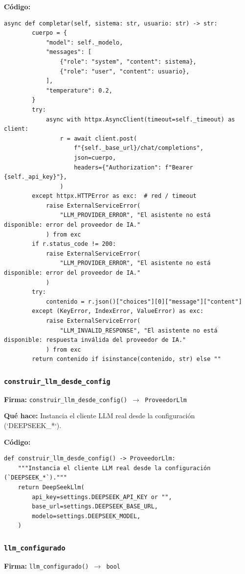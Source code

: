 \documentclass[11pt,a4paper]{article}
\begin{document}
\textbf{Código:}
\begin{lstlisting}
async def completar(self, sistema: str, usuario: str) -> str:
        cuerpo = {
            "model": self._modelo,
            "messages": [
                {"role": "system", "content": sistema},
                {"role": "user", "content": usuario},
            ],
            "temperature": 0.2,
        }
        try:
            async with httpx.AsyncClient(timeout=self._timeout) as client:
                r = await client.post(
                    f"{self._base_url}/chat/completions",
                    json=cuerpo,
                    headers={"Authorization": f"Bearer {self._api_key}"},
                )
        except httpx.HTTPError as exc:  # red / timeout
            raise ExternalServiceError(
                "LLM_PROVIDER_ERROR", "El asistente no está disponible: error del proveedor de IA."
            ) from exc
        if r.status_code != 200:
            raise ExternalServiceError(
                "LLM_PROVIDER_ERROR", "El asistente no está disponible: error del proveedor de IA."
            )
        try:
            contenido = r.json()["choices"][0]["message"]["content"]
        except (KeyError, IndexError, ValueError) as exc:
            raise ExternalServiceError(
                "LLM_INVALID_RESPONSE", "El asistente no está disponible: respuesta inválida del proveedor de IA."
            ) from exc
        return contenido if isinstance(contenido, str) else ""
\end{lstlisting}

\subsubsection*{\texttt{construir\_llm\_desde\_config}}
\textbf{Firma:} \texttt{construir\_llm\_desde\_config() $\rightarrow$ ProveedorLlm}

\textbf{Qué hace:} Instancia el cliente LLM real desde la configuración (`DEEPSEEK\_*`).

\textbf{Código:}
\begin{lstlisting}
def construir_llm_desde_config() -> ProveedorLlm:
    """Instancia el cliente LLM real desde la configuración (`DEEPSEEK_*`)."""
    return DeepSeekLlm(
        api_key=settings.DEEPSEEK_API_KEY or "",
        base_url=settings.DEEPSEEK_BASE_URL,
        modelo=settings.DEEPSEEK_MODEL,
    )
\end{lstlisting}

\subsubsection*{\texttt{llm\_configurado}}
\textbf{Firma:} \texttt{llm\_configurado() $\rightarrow$ bool}
\end{document}
